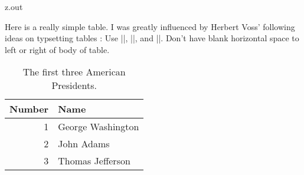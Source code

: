 

\begin{VerbatimOut}{z.out}

Here is a really simple table.
I was greatly influenced by Herbert Voss' following ideas on typsetting tables \cite{voss2011}:
Use |\toprule|, |\midrule|, and |\bottomrule|.
\index{\verb+\toprule+}
\index{\verb+\midrule+}
\index{\verb+\bottomrule+}
Don't have blank horizontal space to left or right of body of table.

\begin{table}[ht]
  \caption{The first three American Presidents.}
  \vspace*{6pt}
  \centering
    \begin{tabular}{@{}rl@{}}
      \toprule
      \bf Number& \bf Name\\
      \midrule
      1& George Washington\\
      2& John Adams\\
      3& Thomas Jefferson\\
      \bottomrule
    \end{tabular}
  \label{ta:first-three-american-presidents}
\end{table}
\index{\verb+\begin{table}+}
\end{VerbatimOut}


